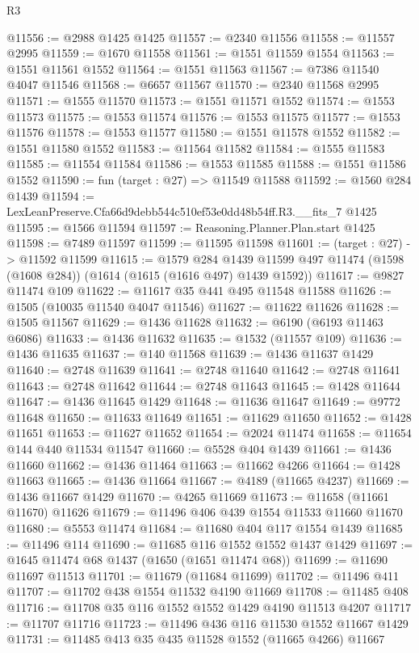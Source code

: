 \begin{lexlean}{R3}
\begin{coremodule}
@11556 := @2988 @1425 @1425
@11557 := @2340 @11556
@11558 := @11557 @2995
@11559 := @1670 @11558
@11561 := @1551 @11559 @1554
@11563 := @1551 @11561 @1552
@11564 := @1551 @11563
@11567 := @7386 @11540 @4047 @11546
@11568 := @6657 @11567
@11570 := @2340 @11568 @2995
@11571 := @1555 @11570
@11573 := @1551 @11571 @1552
@11574 := @1553 @11573
@11575 := @1553 @11574
@11576 := @1553 @11575
@11577 := @1553 @11576
@11578 := @1553 @11577
@11580 := @1551 @11578 @1552
@11582 := @1551 @11580 @1552
@11583 := @11564 @11582
@11584 := @1555 @11583
@11585 := @11554 @11584
@11586 := @1553 @11585
@11588 := @1551 @11586 @1552
@11590 := fun (target : @27) => @11549 @11588
@11592 := @1560 @284 @1439
@11594 := LexLeanPreserve.Cfa66d9debb544c510ef53e0dd48b54ff.R3.__fits_7 @1425
@11595 := @1566 @11594
@11597 := Reasoning.Planner.Plan.start @1425
@11598 := @7489 @11597
@11599 := @11595 @11598
@11601 := (target : @27) -> @11592 @11599
@11615 := @1579
    @284
    @1439
    @11599
    @497
    @11474
    (@1598 (@1608 @284))
    (@1614 (@1615 (@1616 @497) @1439 @1592))
@11617 := @9827 @11474 @109
@11622 := @11617 @35 @441 @495 @11548 @11588
@11626 := @1505 (@10035 @11540 @4047 @11546)
@11627 := @11622 @11626
@11628 := @1505 @11567
@11629 := @1436 @11628
@11632 := @6190 (@6193 @11463 @6086)
@11633 := @1436 @11632
@11635 := @1532 (@11557 @109)
@11636 := @1436 @11635
@11637 := @140 @11568
@11639 := @1436 @11637 @1429
@11640 := @2748 @11639
@11641 := @2748 @11640
@11642 := @2748 @11641
@11643 := @2748 @11642
@11644 := @2748 @11643
@11645 := @1428 @11644
@11647 := @1436 @11645 @1429
@11648 := @11636 @11647
@11649 := @9772 @11648
@11650 := @11633 @11649
@11651 := @11629 @11650
@11652 := @1428 @11651
@11653 := @11627 @11652
@11654 := @2024 @11474
@11658 := @11654 @144 @440 @11534 @11547
@11660 := @5528 @404 @1439
@11661 := @1436 @11660
@11662 := @1436 @11464
@11663 := @11662 @4266
@11664 := @1428 @11663
@11665 := @1436 @11664
@11667 := @4189 (@11665 @4237)
@11669 := @1436 @11667 @1429
@11670 := @4265 @11669
@11673 := @11658 (@11661 @11670) @11626
@11679 := @11496 @406 @439 @1554 @11533 @11660 @11670
@11680 := @5553 @11474
@11684 := @11680 @404 @117 @1554 @1439
@11685 := @11496 @114
@11690 := @11685 @116 @1552 @1552 @1437 @1429
@11697 := @1645 @11474 @68 @1437 (@1650 (@1651 @11474 @68))
@11699 := @11690 @11697 @11513
@11701 := @11679 (@11684 @11699)
@11702 := @11496 @411
@11707 := @11702 @438 @1554 @11532 @4190 @11669
@11708 := @11485 @408
@11716 := @11708 @35 @116 @1552 @1552 @1429 @4190 @11513 @4207
@11717 := @11707 @11716
@11723 := @11496 @436 @116 @11530 @1552 @11667 @1429
@11731 := @11485 @413 @35 @435 @11528 @1552 (@11665 @4266) @11667

\end{coremodule}
\end{lexlean}
